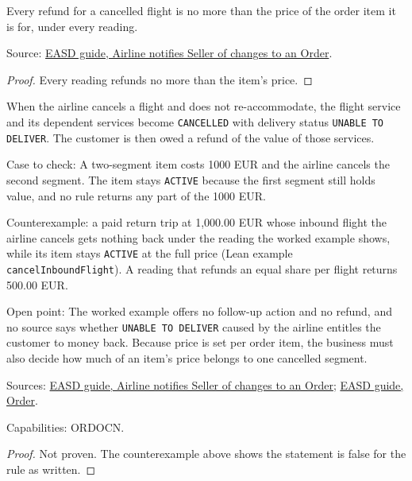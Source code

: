 \begin{theorem}
  \label{thm:airline-change-refund-within-price}
  Every refund for a cancelled flight is no more than the price of the order
  item it is for, under every reading.

  Source: \href{https://standards.atlassian.net/wiki/spaces/EASD/pages/815202352}{EASD guide, Airline notifies Seller of changes to an Order}.
\end{theorem}
\begin{proof}
  Every reading refunds no more than the item's price.
\end{proof}

\begin{theorem}
  \label{thm:airline-change-refund-undeliverable}
  When the airline cancels a flight and does not re-accommodate, the flight
  service and its dependent services become \texttt{CANCELLED} with delivery
  status \texttt{UNABLE TO DELIVER}. The customer is then owed a refund of
  the value of those services.

  Case to check: A two-segment item costs 1000 EUR and the airline cancels
  the second segment. The item stays \texttt{ACTIVE} because the first
  segment still holds value, and no rule returns any part of the 1000 EUR.

  Counterexample: a paid return trip at 1,000.00 EUR whose inbound flight the
  airline cancels gets nothing back under the reading the worked example
  shows, while its item stays \texttt{ACTIVE} at the full price (Lean
  example \texttt{cancelInboundFlight}).  A reading that refunds an equal
  share per flight returns 500.00 EUR.

  Open point: The worked example offers no follow-up action and no refund,
  and no source says whether \texttt{UNABLE TO DELIVER} caused by the
  airline entitles the customer to money back. Because price is set per
  order item, the business must also decide how much of an item's price
  belongs to one cancelled segment.

  Sources: \href{https://standards.atlassian.net/wiki/spaces/EASD/pages/815202352}{EASD guide, Airline notifies Seller of changes to an Order};
  \href{https://standards.atlassian.net/wiki/spaces/EASD/pages/574849062}{EASD guide, Order}.

  Capabilities: ORDOCN.
\end{theorem}
\begin{proof}
  Not proven.  The counterexample above shows the statement is false for the
  rule as written.
\end{proof}

